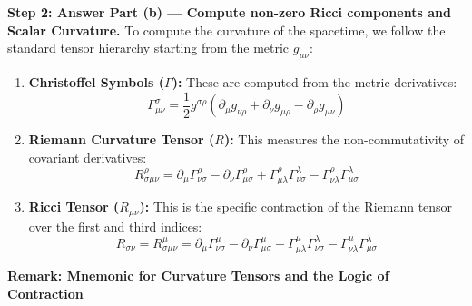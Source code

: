 \begin{solution}
\textbf{Step 2: Answer Part (b) --- Compute non-zero Ricci components and Scalar Curvature.}
To compute the curvature of the spacetime, we follow the standard tensor hierarchy starting from the metric $g_{\mu\nu}$:
\begin{enumerate}
    \item \textbf{Christoffel Symbols ($\Gamma$):} These are computed from the metric derivatives:
    \begin{equation*}
        \Gamma^\sigma_{\mu\nu} = \frac{1}{2} g^{\sigma\rho} (\partial_\mu g_{\nu\rho} + \partial_\nu g_{\mu\rho} - \partial_\rho g_{\mu\nu})
    \end{equation*}
    \item \textbf{Riemann Curvature Tensor ($R$):} This measures the non-commutativity of covariant derivatives:
    \begin{equation*}
        R^\rho_{\sigma\mu\nu} = \partial_\mu \Gamma^\rho_{\nu\sigma} - \partial_\nu \Gamma^\rho_{\mu\sigma} + \Gamma^\rho_{\mu\lambda} \Gamma^\lambda_{\nu\sigma} - \Gamma^\rho_{\nu\lambda} \Gamma^\lambda_{\mu\sigma}
    \end{equation*}
    \item \textbf{Ricci Tensor ($R_{\mu\nu}$):} This is the specific contraction of the Riemann tensor over the first and third indices:
    \begin{equation*}
        R_{\sigma\nu} = R^\mu_{\sigma\mu\nu} = \partial_\mu \Gamma^\mu_{\nu\sigma} - \partial_\nu \Gamma^\mu_{\mu\sigma} + \Gamma^\mu_{\mu\lambda} \Gamma^\lambda_{\nu\sigma} - \Gamma^\mu_{\nu\lambda} \Gamma^\lambda_{\mu\sigma}
    \end{equation*}
\end{enumerate}

\textbf{Remark: Mnemonic for Curvature Tensors and the Logic of Contraction}


\end{solution}
